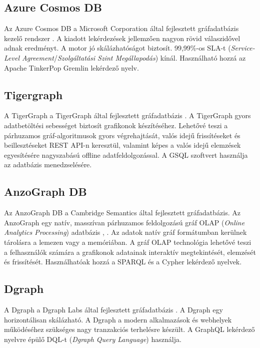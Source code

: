 \subsection{Azure Cosmos DB}

Az Azure Cosmos DB a Microsoft Corporation által fejlesztett gráfadatbázis kezelő rendszer \cite{azure}. A kiadott lekérdezések jellemzően nagyon rövid válaszidővel adnak eredményt. A motor jó skálázhatóságot biztosít. 99,99\%-os SLA-t (\textit{Service-Level Agreement}/\textit{Szolgáltatási Szint Megállapodás}) kínál. Használható hozzá az Apache TinkerPop Gremlin lekérdező nyelv.

\subsection{Tigergraph}

A TigerGraph a TigerGraph által fejlesztett gráfadatbázis \cite{tigergraph}. A TigerGraph gyors adatbetöltési sebességet biztosít grafikonok készítéséhez. Lehetővé teszi a párhuzamos gráf-algoritmusok gyors végrehajtását, valós idejű frissítéseket és beillesztéseket REST API-n keresztül, valamint képes a valós idejű elemzések egyesítésére nagyszabású offline adatfeldolgozással. A GSQL szoftvert használja az adatbázis menedzselésére.

\subsection{AnzoGraph DB}

Az AnzoGraph DB a Cambridge Semantics által fejlesztett gráfadatbázis. Az AnzoGraph egy natív, masszívan párhuzamos feldolgozású gráf OLAP (\textit{Online Analytics Processing}) adatbázis \cite{anzograph1}, \cite{anzograph2}. Az adatok natív gráf formátumban kerülnek tárolásra a lemezen vagy a memóriában. A gráf OLAP technológia lehetővé teszi a felhasználók számára a grafikonok adatainak interaktív megtekintését, elemzését és frissítését. Használhatóak hozzá a SPARQL és a Cypher lekérdező nyelvek.

\subsection{Dgraph}

A Dgraph a Dgraph Labs által fejlesztett gráfadatbázis \cite{dgraph}. A Dgraph egy horizontálisan skálázható. A Dgraph a modern alkalmazások és webhelyek működéséhez szükséges nagy tranzakciós terhelésre készült. A GraphQL lekérdező nyelvre épülő DQL-t (\textit{Dgraph Query Language}) használja.
